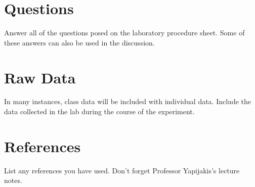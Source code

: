 \documentclass{article}
\begin{document}
\section{Questions}
    Answer all of the questions posed on the laboratory procedure sheet. Some of these answers can also be used in the discussion.
\section{Raw Data}
    In many instances, class data will be included with individual data. Include the data collected in the lab during the course of the experiment.
\section{References}
    List any references you have used. Don't forget Professor Yapijakis's lecture notes.
\end{document}
